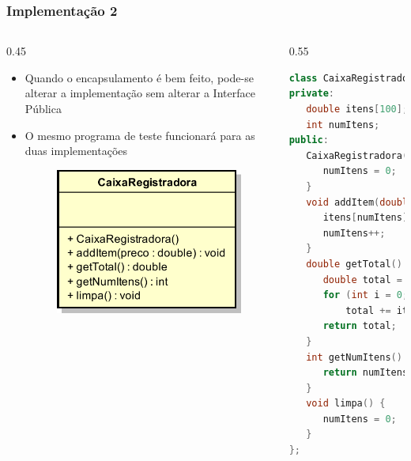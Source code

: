 \documentclass[aspectratio=169]{beamer}
\begin{document}
\begin{frame}[fragile]\frametitle{Implementação 2}
\begin{columns}
\begin{column}{0.45\linewidth}
\begin{itemize}
	\item Quando o encapsulamento é bem feito, pode-se alterar a implementação sem alterar a Interface Pública
	\item O mesmo programa de teste funcionará para as duas implementações
	\begin{figure}[h]
		\centering
		\includegraphics[height=0.3\paperheight]{imagens/caixa_sem_atributos.png}
	\end{figure}
\end{itemize}
\end{column}
\begin{column}{0.55\linewidth}
\begin{lstlisting}[language=C++,basicstyle=\ttfamily\tiny]
class CaixaRegistradora {
private:
   double itens[100];
   int numItens;
public:
   CaixaRegistradora(){
      numItens = 0;
   }
   void addItem(double preco) {
      itens[numItens] = preco;
      numItens++;
   }
   double getTotal() {
      double total = 0;
      for (int i = 0; i < numItens; i++)
          total += itens[i];
      return total;
   }
   int getNumItens() {
      return numItens;
   }
   void limpa() {
      numItens = 0;
   }
};
\end{lstlisting}
\end{column}
\end{columns}
\end{frame}
\end{document}

